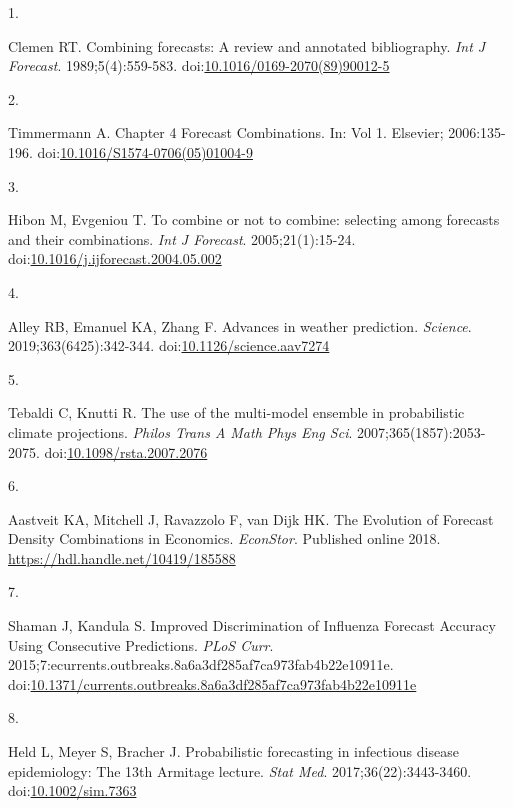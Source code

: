 \documentclass[
]{article}
\newlength{\cslhangindent}
\newlength{\csllabelwidth}
\newenvironment{CSLReferences}[2] %
 {\begin{list}{}{%
  \setlength{\itemindent}{0pt}
  \setlength{\leftmargin}{0pt}
  \setlength{\parsep}{0pt}
  \ifodd #1
   \setlength{\leftmargin}{\cslhangindent}
   \setlength{\itemindent}{-1\cslhangindent}
  \fi
  \setlength{\itemsep}{#2\baselineskip}}}
 {\end{list}}
\newcommand{\CSLLeftMargin}[1]{\parbox[t]{\csllabelwidth}{\strut#1\strut}}
\newcommand{\CSLRightInline}[1]{\parbox[t]{\linewidth - \csllabelwidth}{\strut#1\strut}}
\begin{document}
\label{refs}
\begin{CSLReferences}{0}{1}
\CSLLeftMargin{1. }%
\CSLRightInline{Clemen RT. Combining forecasts: A review and annotated
bibliography. \emph{Int J Forecast}. 1989;5(4):559-583.
doi:\href{https://doi.org/10.1016/0169-2070(89)90012-5}{10.1016/0169-2070(89)90012-5}}

\CSLLeftMargin{2. }%
\CSLRightInline{Timmermann A. Chapter 4 Forecast Combinations. In: Vol
1. Elsevier; 2006:135-196.
doi:\href{https://doi.org/10.1016/S1574-0706(05)01004-9}{10.1016/S1574-0706(05)01004-9}}

\CSLLeftMargin{3. }%
\CSLRightInline{Hibon M, Evgeniou T. To combine or not to combine:
selecting among forecasts and their combinations. \emph{Int J Forecast}.
2005;21(1):15-24.
doi:\href{https://doi.org/10.1016/j.ijforecast.2004.05.002}{10.1016/j.ijforecast.2004.05.002}}

\CSLLeftMargin{4. }%
\CSLRightInline{Alley RB, Emanuel KA, Zhang F. Advances in weather
prediction. \emph{Science}. 2019;363(6425):342-344.
doi:\href{https://doi.org/10.1126/science.aav7274}{10.1126/science.aav7274}}

\CSLLeftMargin{5. }%
\CSLRightInline{Tebaldi C, Knutti R. The use of the multi-model ensemble
in probabilistic climate projections. \emph{Philos Trans A Math Phys Eng
Sci}. 2007;365(1857):2053-2075.
doi:\href{https://doi.org/10.1098/rsta.2007.2076}{10.1098/rsta.2007.2076}}

\CSLLeftMargin{6. }%
\CSLRightInline{Aastveit KA, Mitchell J, Ravazzolo F, van Dijk HK. The
Evolution of Forecast Density Combinations in Economics.
\emph{EconStor}. Published online 2018.
\url{https://hdl.handle.net/10419/185588}}

\CSLLeftMargin{7. }%
\CSLRightInline{Shaman J, Kandula S. Improved {Discrimination} of
{Influenza} {Forecast} {Accuracy} {Using} {Consecutive} {Predictions}.
\emph{PLoS Curr}.
2015;7:ecurrents.outbreaks.8a6a3df285af7ca973fab4b22e10911e.
doi:\href{https://doi.org/10.1371/currents.outbreaks.8a6a3df285af7ca973fab4b22e10911e}{10.1371/currents.outbreaks.8a6a3df285af7ca973fab4b22e10911e}}

\CSLLeftMargin{8. }%
\CSLRightInline{Held L, Meyer S, Bracher J. Probabilistic forecasting in
infectious disease epidemiology: The 13th {Armitage} lecture. \emph{Stat
Med}. 2017;36(22):3443-3460.
doi:\href{https://doi.org/10.1002/sim.7363}{10.1002/sim.7363}}


\end{CSLReferences}
\end{document}
